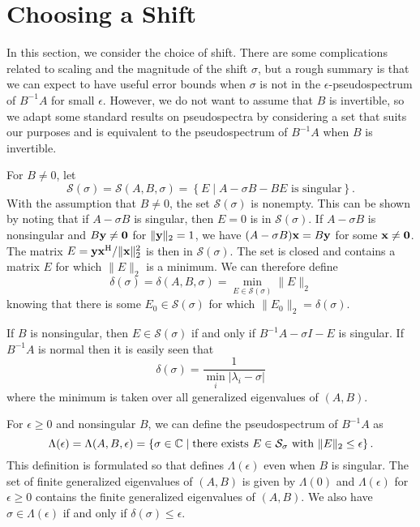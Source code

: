 \documentclass[12pt]{article}
\def\vec#1{{\bf #1}}
\def\H{{\rm H}}
\def\mcal{\mathcal}
\begin{document}
\section{Choosing a Shift}
\label{sec:shift}

In this section, we consider the choice of shift.  There are some
complications related to scaling and the magnitude of the shift
$\sigma$, but a rough summary is that we can expect to have useful
error bounds when $\sigma$ is not in the $\epsilon$-pseudospectrum of
$B^{-1}A$ for small $\epsilon$.  However, we do not want to assume
that $B$ is invertible, so we adapt some standard results on
pseudospectra by considering a set that suits our purposes and is
equivalent to the pseudospectrum of $B^{-1}A$ when $B$ is invertible.


For $B\neq 0$, let
\begin{equation}
  \label{eq:S_def}
  \mathcal{S}(\sigma) =
  \mathcal{S}(A,B,\sigma) = 
  \left\{ E \mid \mbox{$A - \sigma B - B E$ is singular} \right\}.
\end{equation}
With the assumption that $B\neq 0$, the set $\mcal{S}(\sigma)$ is
nonempty.  This can be shown by noting that if $A-\sigma B$ is
singular, then $E=0$ is in $\mcal{S}(\sigma)$.  If $A-\sigma B$ is
nonsingular and $B\vec{y}\neq \vec{0}$ for $\|\vec{y}\|_2 = 1$, we
have $(A-\sigma B) \vec{x} = B\vec{y}$ for some $\vec{x}\neq \vec{0}$.
The matrix $E = \vec{y}\vec{x}^\H/\|\vec{x}\|_2^2$ is then in
$\mcal{S}(\sigma)$.  The set is closed and contains a matrix $E$
for which $\|E\|_2$ is a minimum.  We can therefore define
\begin{equation}
  \label{eq:delta_def}
  \delta(\sigma) = \delta(A,B,\sigma) =
  \min_{E\in \mcal{S}(\sigma)} \|E\|_2
\end{equation}
knowing that there is some $E_0\in \mcal{S}(\sigma)$ for which
$\|E_0\|_2 = \delta(\sigma)$.  

If $B$ is nonsingular, then $E\in \mcal{S}(\sigma)$ if and only if
$B^{-1}A - \sigma I -E$ is singular.  If $B^{-1}A$ is normal then it
is easily seen that
\begin{equation}
  \label{eq:normal_delta}
  \delta(\sigma) = \frac{1}{\min_i |\lambda_i - \sigma|}
\end{equation}
where the minimum is taken over all generalized eigenvalues of $(A,B)$.

For $\epsilon \geq 0$ and nonsingular $B$, we can define the pseudospectrum of $B^{-1}A$ as
\begin{equation}
  \label{eq:pseudo_def}
  \Lambda(\epsilon) = \Lambda(A, B, \epsilon) =
  \left\{ \sigma \in {\mathbb C} \mid \mbox{there exists $E\in \mathcal{S}_\sigma$
      with $\|E\|_2\leq \epsilon$}
  \right\}.
\end{equation}
This definition is formulated so that defines $\Lambda(\epsilon)$ even
when $B$ is singular.  The set of finite generalized eigenvalues of
$(A,B)$ is given by $\Lambda(0)$ and $\Lambda(\epsilon)$ for
$\epsilon \geq 0$ contains the finite generalized eigenvalues of $(A,B)$.  We
also have $\sigma \in \Lambda(\epsilon)$ if and only if
$\delta(\sigma)\leq \epsilon$.
\end{document}
